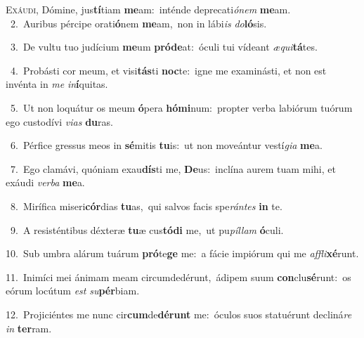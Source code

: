 \lettrine{\initial\textcolor{\initialcolor}{E}}{xáudi,} Dómine, jus\-\textbf{tí}\-tiam \textbf{me}\-am:~\star inténde deprecati\-\textit{ó}\-\textit{nem} \textbf{me}\-am.\\
{\numbfont\textcolor{\numbcolor}{~2.}}~Auribus pércipe orati\-\textbf{ó}\-nem \textbf{me}\-am,~\star non in lábi\textit{is} \textit{do}\-\textbf{ló}sis.\par
{\numbfont\textcolor{\numbcolor}{~3.}}~De vultu tuo judícium \textbf{me}\-um \textbf{pród}\-\textbf{e}at:~\star óculi tui vídeant \textit{æ}\-\textit{qui}\textbf{tá}tes.\par
{\numbfont\textcolor{\numbcolor}{~4.}}~Probásti cor meum, et visi\-\textbf{tás}\-ti \textbf{noc}\-te:~\star igne me examinásti, et non est invénta in \textit{me} \textit{in}\-\textbf{í}quitas.\par
{\numbfont\textcolor{\numbcolor}{~5.}}~Ut non loquátur os meum \textbf{ó}\-pera \textbf{hó}\-\textbf{mi}num:~\star propter verba labiórum tuórum ego custodívi \textit{vi}\-\textit{as} \textbf{du}\-ras.\par
{\numbfont\textcolor{\numbcolor}{~6.}}~Pérfice gressus meos in \textbf{sé}\-mitis \textbf{tu}\-is:~\star ut non moveántur vestí\-\textit{gi}\-\textit{a} \textbf{me}\-a.\par
{\numbfont\textcolor{\numbcolor}{~7.}}~Ego clamávi, quóniam exau\-\textbf{dís}\-ti me, \textbf{De}\-us:~\star inclína aurem tuam mihi, et exáudi \textit{ver}\-\textit{ba} \textbf{me}\-a.\par
{\numbfont\textcolor{\numbcolor}{~8.}}~Mirífica miseri\-\textbf{cór}\-dias \textbf{tu}\-as,~\star qui salvos facis spe\-\textit{rán}\-\textit{tes} \textbf{in} te.\par
{\numbfont\textcolor{\numbcolor}{~9.}}~A resisténtibus déxteræ \textbf{tu}\-æ cus\-\textbf{tó}\-\textbf{di} me,~\star ut pu\-\textit{píl}\-\textit{lam} \textbf{ó}\-culi.\par
{\numbfont\textcolor{\numbcolor}{10.}}~Sub umbra alárum tuárum \textbf{pró}\-te\textbf{ge} me:~\star a fácie impiórum qui me \textit{af}\-\textit{fli}\textbf{xé}runt.\par
{\numbfont\textcolor{\numbcolor}{11.}}~Inimíci mei ánimam meam circumdedérunt,~\dagger ádipem suum \textbf{con}\-clu\-\textbf{sé}\-runt:~\star os eórum locútum \textit{est} \textit{su}\-\textbf{pér}biam.\par
{\numbfont\textcolor{\numbcolor}{12.}}~Projiciéntes me nunc cir\-\textbf{cum}\-de\-\textbf{dé}\-\textbf{runt} me:~\star óculos suos statuérunt decliná\textit{re} \textit{in} \textbf{ter}\-ram.\par
